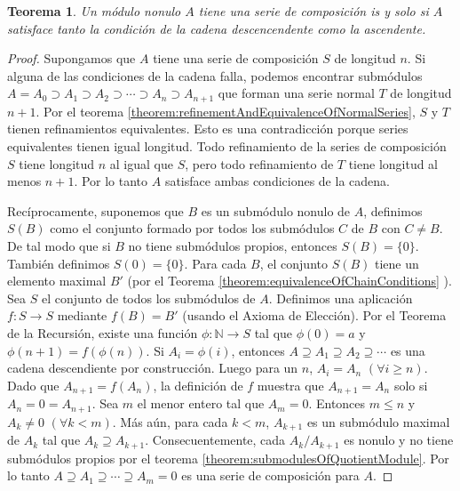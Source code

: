 \documentclass{report}
\newcommand{\naturalNumbers}{\mathbb{N}}
\newtheorem{theorem}{Teorema}
\begin{document}
  \begin{theorem}
    \label{theorem:compositionSeriesAndChainConditions}
    Un módulo nonulo \(A\) tiene una serie de composición is y solo si \(A\) satisface tanto la condición de la cadena descencendente como la ascendente.
  \end{theorem}
  \begin{proof}
    Supongamos que \(A\) tiene una serie de composición \(S\) de longitud \(n\).
    Si alguna de las condiciones de la cadena falla, podemos encontrar submódulos \(A = A_0 \supset A_1 \supset A_2 \supset \cdots \supset A_n \supset A_{n + 1}\)
    que forman una serie normal \(T\) de longitud \(n + 1\).
    Por el teorema \ref{theorem:refinementAndEquivalenceOfNormalSeries}, \(S\) y \(T\) tienen refinamientos equivalentes.
    Esto es una contradicción porque series equivalentes tienen igual longitud.
    Todo refinamiento de la series de composición \(S\) tiene longitud \(n\) al igual que \(S\), pero todo refinamiento de \(T\) tiene longitud al menos \(n + 1\).
    Por lo tanto \(A\) satisface ambas condiciones de la cadena.

    Recíprocamente, suponemos que \(B\) es un submódulo nonulo de \(A\), definimos \(S(B)\) como el conjunto formado por todos los submódulos \(C\) de \(B\) con \(C \neq B\).
    De tal modo que si \(B\) no tiene submódulos propios, entonces \(S(B) = \{0\}\).
    También definimos \(S(0) = \{0\}\).
    Para cada \(B\), el conjunto \(S(B)\) tiene un elemento maximal \(B'\) (por el Teorema \ref{theorem:equivalenceOfChainConditions}
    ).
    Sea \(S\) el conjunto de todos los submódulos de \(A\).
    Definimos una aplicación \(f : S \rightarrow S\) mediante \(f(B) = B'\) (usando el Axioma de Elección).
    Por el Teorema de la Recursión, existe una función \(\phi : \naturalNumbers \rightarrow S\) tal que \(\phi(0) = a\) y \(\phi(n + 1) = f(\phi(n))\).
    Si \(A_i = \phi(i)\), entonces \(A \supseteq A_1 \supseteq A_2 \supseteq \cdots\) es una cadena descendiente por construcción.
    Luego para un \(n\), \(A_i = A_n\) \((\forall i \geq n)\).
    Dado que \(A_{n + 1} = f(A_n)\), la definición de \(f\) muestra que \(A_{n + 1} = A_n\) solo si \(A_n = 0 = A_{n + 1}\).
    Sea \(m\) el menor entero tal que \(A_m = 0\).
    Entonces \(m \leq n\) y \(A_k \neq 0\) \((\forall k < m)\).
    Más aún, para cada \(k < m\), \(A_{k + 1}\) es un submódulo maximal de \(A_k\) tal que \(A_k \supseteq A_{k + 1}\).
    Consecuentemente, cada \(A_k / A_{k + 1}\) es nonulo y no tiene submódulos propios por el teorema \ref{theorem:submodulesOfQuotientModule}.
    Por lo tanto \(A \supseteq A_1 \supseteq \cdots \supseteq A_m = 0\) es una serie de composición para \(A\).
  \end{proof}
\end{document}
